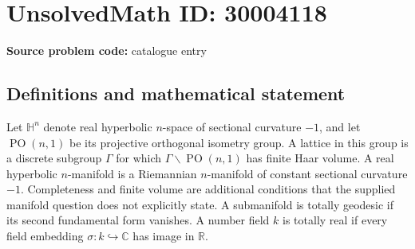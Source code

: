 \documentclass[11pt]{article}
\newcommand{\R}{\mathbb{R}}
\newcommand{\C}{\mathbb{C}}
\begin{document}
\section*{UnsolvedMath ID: 30004118}
\textbf{Source problem code:} catalogue entry
\subsection{Definitions and mathematical statement}
Let \(\mathbb H^n\) denote real hyperbolic \(n\)-space of sectional curvature \(-1\), and let \(\operatorname{PO}(n,1)\) be its projective orthogonal isometry group. A lattice in this group is a discrete subgroup \(\Gamma\) for which \(\Gamma\backslash\operatorname{PO}(n,1)\) has finite Haar volume. A real hyperbolic \(n\)-manifold is a Riemannian \(n\)-manifold of constant sectional curvature \(-1\). Completeness and finite volume are additional conditions that the supplied manifold question does not explicitly state. A submanifold is totally geodesic if its second fundamental form vanishes. A number field \(k\) is totally real if every field embedding \(\sigma:k\hookrightarrow\C\) has image in \(\R\).
\end{document}
